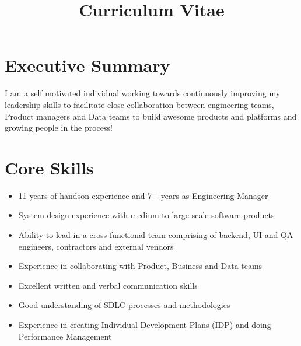 \documentclass[11pt,a4paper,sans]{moderncv} %
\title{Curriculum Vitae}
\begin{document}
\makecvtitle %

\section{Executive Summary}
I am a self motivated individual working towards continuously improving my leadership skills to facilitate close collaboration between engineering teams, Product managers and Data teams to build awesome products and platforms and growing people in the process!

\section{Core Skills}
\begin{multicols}{2}
    \begin{itemize}
        \item 11 years of handson experience and 7+ years as Engineering Manager
        \item System design experience with medium to large scale software products
        \item Ability to lead in a cross-functional team comprising of backend, UI and QA engineers, contractors and external vendors
        \item Experience in collaborating with Product, Business and Data teams
        \item Excellent written and verbal communication skills
        \item Good understanding of SDLC processes and methodologies
        \item Experience in creating Individual Development Plans (IDP) and doing Performance Management
    \end{itemize}
\end{multicols}

\end{document}
